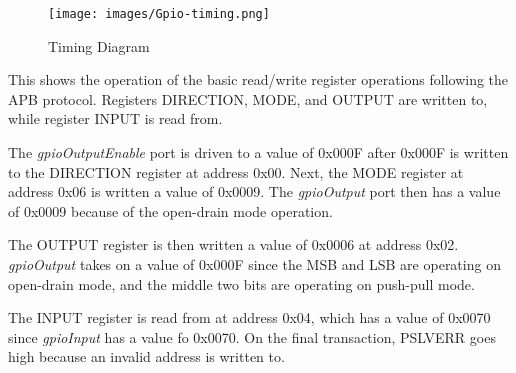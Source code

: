 \begin{figure}[h]
  \texttt{[image: images/Gpio-timing.png]}
  \caption{Timing Diagram}\label{fig:timing}
\end{figure}

This shows the operation of the basic read/write register operations following the APB protocol. Registers DIRECTION, MODE, and OUTPUT are
written to, while register INPUT is read from.

The \textit{gpioOutputEnable} port is driven to a value of 0x000F after 0x000F is written to the DIRECTION register 
at address 0x00. Next, the MODE register at address 0x06 is written a value of 0x0009. The \textit{gpioOutput} port 
then has a value of 0x0009 because of the open-drain mode operation. 

The OUTPUT register is then written a value of 0x0006 at address 0x02. \textit{gpioOutput} takes on a value of 0x000F
since the MSB and LSB are operating on open-drain mode, and the middle two bits are operating on push-pull mode. 

The INPUT register is read from at address 0x04, which has a value of 0x0070 since \textit{gpioInput} has a value fo 0x0070.
On the final transaction, PSLVERR goes high because an invalid address is written to.

